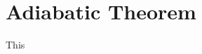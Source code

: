 \documentclass{article}
\begin{document}
 \section*{\LARGE{Adiabatic Theorem}}
 \begin{Large}
  This 
 \end{Large}
\end{document}
